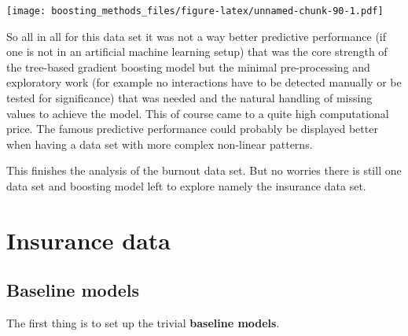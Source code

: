 \documentclass[
]{book}
\newenvironment{Shaded}{\begin{snugshade}}{\end{snugshade}}
\newcommand{\AttributeTok}[1]{\textcolor[rgb]{0.77,0.63,0.00}{#1}}
\newcommand{\CommentTok}[1]{\textcolor[rgb]{0.56,0.35,0.01}{\textit{#1}}}
\newcommand{\ControlFlowTok}[1]{\textcolor[rgb]{0.13,0.29,0.53}{\textbf{#1}}}
\newcommand{\FunctionTok}[1]{\textcolor[rgb]{0.00,0.00,0.00}{#1}}
\newcommand{\NormalTok}[1]{#1}
\newcommand{\OtherTok}[1]{\textcolor[rgb]{0.56,0.35,0.01}{#1}}
\newcommand{\SpecialCharTok}[1]{\textcolor[rgb]{0.00,0.00,0.00}{#1}}
\begin{document}
\texttt{[image: boosting\_methods\_files/figure-latex/unnamed-chunk-90-1.pdf]}

So all in all for this data set it was not a way better predictive performance (if one is not in an artificial machine learning setup) that was the core strength of the tree-based gradient boosting model but the minimal pre-processing and exploratory work (for example no interactions have to be detected manually or be tested for significance) that was needed and the natural handling of missing values to achieve the model. This of course came to a quite high computational price. The famous predictive performance could probably be displayed better when having a data set with more complex non-linear patterns.

This finishes the analysis of the burnout data set. But no worries there is still one data set and boosting model left to explore namely the insurance data set.

\hypertarget{insurance-data}{%
\section{Insurance data}\label{insurance-data}}

\hypertarget{baseline-models-1}{%
\subsection{Baseline models}\label{baseline-models-1}}

The first thing is to set up the trivial \textbf{baseline models}.

\begin{Shaded}
\end{Shaded}
\end{document}
